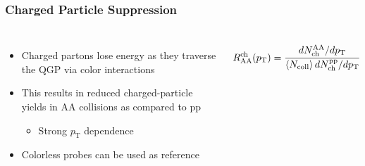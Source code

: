 \documentclass[9pt]{beamer}
\begin{document}
     \begin{frame}
       \frametitle{\textbf{Charged Particle Suppression}}
       \begin{columns}
         \begin{itemize}
         \item Charged partons lose energy as they traverse the QGP via color interactions
         \item This results in reduced charged-particle yields in AA collisions as compared to pp
           \begin{itemize}
           \item Strong $p_{\text{T}}$ dependence
           \end{itemize}
         \item Colorless probes can be used as reference
         \end{itemize}
         \begin{align*}
           R_{\text{AA}}^{\text{ch}} (p_{\text{T}}) = \cfrac{dN^{\text{AA}}_{\text{ch}} / dp_{\text{T}}}{\left< N_{\text{coll}} \right> dN^{\text{pp}}_{\text{ch}} / dp_{\text{T}}}
         \end{align*}
       \end{columns}
     \end{frame}
\end{document}
